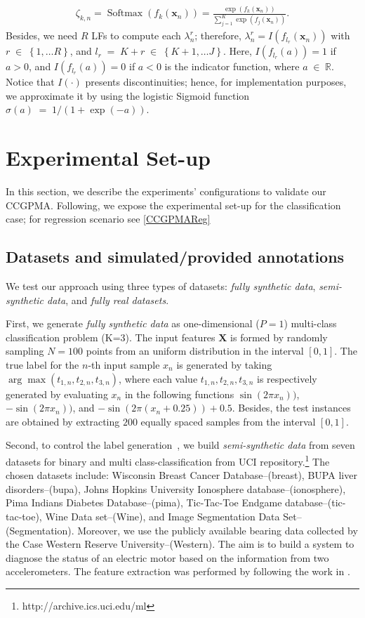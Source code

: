 \documentclass[journal]{IEEEtran}
\providecommand{\ve}[1]{{\bm{#1}}}%
\providecommand{\mat}[1]{{\bm{#1}}} %
\newcommand{\Real}{\mathbb{R}}
\DeclareMathOperator{\en}{\!\,\in\!\,}
\DeclareMathOperator{\igual}{\!\,=\!\,}
\providecommand{\ve}[1]{{\mathbf{#1}}}
\providecommand{\mat}[1]{{\mathbf{#1}}}
\begin{document}
\begin{align}
\zeta_{k,n} =\operatorname{Softmax}(f_k(\ve{x}_n))= \frac{\exp(f_k(\ve{x}_n))}{\sum_{j=1}^{K}\exp(f_j(\ve{x}_n))}.
\end{align}
Besides, we need $R$ LFs to compute each ${\lambda}_n^r$; therefore, ${\lambda}_n^r=I(f_{l_r}(\ve{x}_n))$ with $r\en \left\{1, \dots R\right\}$, and $l_r \igual K+r \en \left\{K+1, \dots J\right\}$. Here, $I(f_{l_r}(a))=1$ if $a>0$, and $I(f_{l_r}(a))=0$ if $a<0$ is the indicator function, where $a\en\Real.$ Notice that $I(\cdot)$ presents discontinuities; hence, for implementation purposes, we approximate it by using the logistic Sigmoid function $\sigma(a)\igual{1}/{(1+\exp(-a))}$.

\section{Experimental Set-up}\label{sec:expsetup}
In this section, we describe the experiments' configurations
to validate our CCGPMA. Following, we expose the experimental
set-up for the classification case; for regression
scenario see \cref{CCGPMAReg}

\subsection{Datasets and simulated/provided annotations}\label{sec:datasets}
We test our approach using three types of datasets:  \textit{fully synthetic data}, \textit{semi-synthetic data}, and \textit{fully real datasets}. 

First, we generate \textit{fully synthetic data} as one-dimensional ($P=1$) multi-class classification problem (K=3). The input features $\mat{X}$ is formed by randomly sampling $N=100$ points from an uniform distribution in the interval $[0,1]$. The true label for the $n$-th input sample ${x}_n$ is generated by taking $\arg \max (t_{1,n}, t_{2,n}, t_{3,n})$, where each value $t_{1,n}, t_{2,n}, t_{3,n}$ is respectively generated by evaluating ${x}_n$ in the following functions $\sin(2\pi{x}_n))$, $-\sin(2\pi{x}_n))$, and $-\sin(2\pi({x}_n+0.25))+0.5$. Besides, the test instances are obtained by extracting $200$ equally spaced samples from the interval $[0,1]$.

Second, to control the label generation~\cite{ruiz2019learning}, we build \textit{semi-synthetic data} from seven datasets for  binary and multi class-classification from {UCI repository}.\footnote{http://archive.ics.uci.edu/ml} The chosen datasets include: {Wisconsin Breast Cancer Database}--(breast), {BUPA liver disorders}--(bupa), {Johns Hopkins University Ionosphere database}--(ionosphere), {Pima Indians Diabetes Database}--(pima), {Tic-Tac-Toe Endgame database}--(tic-tac-toe), {Wine Data set}--(Wine), and {Image Segmentation Data Set}--(Segmentation). Moreover, we use the publicly available bearing data collected by the Case Western Reserve University--(Western). The aim is to build a system to diagnose the status of an electric motor based on the information from two accelerometers. The feature extraction was performed by following the work in \cite{hernandez2020bearing}.
\end{document}
